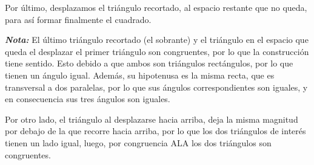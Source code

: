 \documentclass{amsart}
\begin{document}
{    Por último, desplazamos el triángulo recortado, al espacio restante que no queda, para así formar finalmente el cuadrado.

    \begin{figure}[H]
        \centering
    \end{figure}

    \textit{\textbf{Nota:}} El último triángulo recortado (el sobrante) y el triángulo en el espacio que queda el desplazar el primer triángulo son congruentes, por lo que la construcción tiene sentido. Esto debido a que ambos son triángulos rectángulos, por lo que tienen un ángulo igual. Además, su hipotenusa es la misma recta, que es transversal a dos paralelas, por lo que sus ángulos correspondientes son iguales, y en consecuencia sus tres ángulos son iguales.

    Por otro lado, el triángulo al desplazarse hacia arriba, deja la misma magnitud por debajo de la que recorre hacia arriba, por lo que los dos triángulos de interés tienen un lado igual, luego, por congruencia ALA los dos triángulos son congruentes.
}

\newpage
\end{document}
